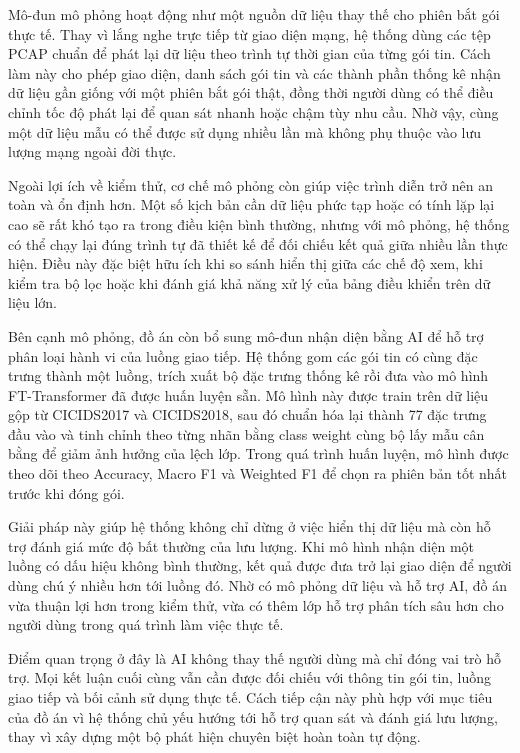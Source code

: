 \documentclass[../DoAn.tex]{subfiles}
\begin{document}
Mô-đun mô phỏng hoạt động như một nguồn dữ liệu thay thế cho phiên bắt gói thực tế. Thay vì lắng nghe trực tiếp từ giao diện mạng, hệ thống dùng các tệp PCAP chuẩn để phát lại dữ liệu theo trình tự thời gian của từng gói tin. Cách làm này cho phép giao diện, danh sách gói tin và các thành phần thống kê nhận dữ liệu gần giống với một phiên bắt gói thật, đồng thời người dùng có thể điều chỉnh tốc độ phát lại để quan sát nhanh hoặc chậm tùy nhu cầu. Nhờ vậy, cùng một dữ liệu mẫu có thể được sử dụng nhiều lần mà không phụ thuộc vào lưu lượng mạng ngoài đời thực.

Ngoài lợi ích về kiểm thử, cơ chế mô phỏng còn giúp việc trình diễn trở nên an toàn và ổn định hơn. Một số kịch bản cần dữ liệu phức tạp hoặc có tính lặp lại cao sẽ rất khó tạo ra trong điều kiện bình thường, nhưng với mô phỏng, hệ thống có thể chạy lại đúng trình tự đã thiết kế để đối chiếu kết quả giữa nhiều lần thực hiện. Điều này đặc biệt hữu ích khi so sánh hiển thị giữa các chế độ xem, khi kiểm tra bộ lọc hoặc khi đánh giá khả năng xử lý của bảng điều khiển trên dữ liệu lớn.

Bên cạnh mô phỏng, đồ án còn bổ sung mô-đun nhận diện bằng AI để hỗ trợ phân loại hành vi của luồng giao tiếp. Hệ thống gom các gói tin có cùng đặc trưng thành một luồng, trích xuất bộ đặc trưng thống kê rồi đưa vào mô hình FT-Transformer đã được huấn luyện sẵn. Mô hình này được train trên dữ liệu gộp từ CICIDS2017 và CICIDS2018, sau đó chuẩn hóa lại thành 77 đặc trưng đầu vào và tinh chỉnh theo từng nhãn bằng class weight cùng bộ lấy mẫu cân bằng để giảm ảnh hưởng của lệch lớp. Trong quá trình huấn luyện, mô hình được theo dõi theo Accuracy, Macro F1 và Weighted F1 để chọn ra phiên bản tốt nhất trước khi đóng gói.

Giải pháp này giúp hệ thống không chỉ dừng ở việc hiển thị dữ liệu mà còn hỗ trợ đánh giá mức độ bất thường của lưu lượng. Khi mô hình nhận diện một luồng có dấu hiệu không bình thường, kết quả được đưa trở lại giao diện để người dùng chú ý nhiều hơn tới luồng đó. Nhờ có mô phỏng dữ liệu và hỗ trợ AI, đồ án vừa thuận lợi hơn trong kiểm thử, vừa có thêm lớp hỗ trợ phân tích sâu hơn cho người dùng trong quá trình làm việc thực tế.

Điểm quan trọng ở đây là AI không thay thế người dùng mà chỉ đóng vai trò hỗ trợ. Mọi kết luận cuối cùng vẫn cần được đối chiếu với thông tin gói tin, luồng giao tiếp và bối cảnh sử dụng thực tế. Cách tiếp cận này phù hợp với mục tiêu của đồ án vì hệ thống chủ yếu hướng tới hỗ trợ quan sát và đánh giá lưu lượng, thay vì xây dựng một bộ phát hiện chuyên biệt hoàn toàn tự động.
\end{document}
